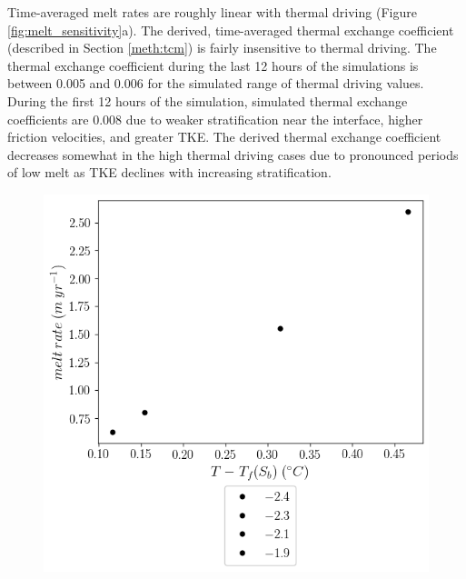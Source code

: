 \documentclass[draft]{agujournal2019}
\begin{document}
Time-averaged melt rates are roughly linear with thermal driving (Figure \ref{fig:melt_sensitivity}a). The derived, time-averaged thermal exchange coefficient (described in Section \ref{meth:tcm}) is fairly insensitive to thermal driving. The thermal exchange coefficient during the last 12 hours of the simulations is between 0.005 and 0.006 for the simulated range of thermal driving values. During the first 12 hours of the simulation, simulated thermal exchange coefficients are 0.008 due to weaker stratification near the interface, higher friction velocities, and greater TKE. The derived thermal exchange coefficient decreases somewhat in the high thermal driving cases due to pronounced periods of low melt as TKE declines with increasing stratification. 

\begin{figure}[h!]
    \centering
    \begin{minipage}{0.5\textwidth}
        \includegraphics[trim={0 3.5cm 0 0},clip,width=\textwidth]{Figures/melt_dT_tav12.png}
    \end{minipage}%
    \begin{minipage}{0.5\textwidth}

\end{minipage}
\end{figure}
\end{document}
